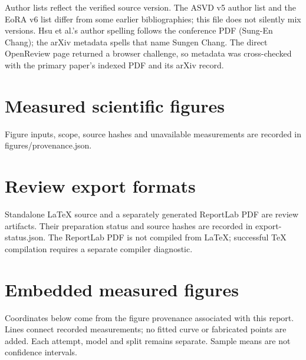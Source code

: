 \documentclass[10pt]{article}
\begin{document}
Author lists reflect the verified source version. The ASVD v5 author list and
the EoRA v6 list differ from some earlier bibliographies; this file does not
silently mix versions. Hsu et al.'s author spelling follows the conference PDF
(Sung-En Chang); the arXiv metadata spells that name Sungen Chang. The direct
OpenReview page returned a browser challenge, so metadata was cross-checked
with the primary paper's indexed PDF and its arXiv record.

\section{Measured scientific figures}








Figure inputs, scope, source hashes and unavailable measurements are recorded in figures/provenance.json.

\section{Review export formats}

Standalone LaTeX source and a separately generated ReportLab PDF are review artifacts. Their preparation status and source hashes are recorded in export-status.json. The ReportLab PDF is not compiled from LaTeX; successful TeX compilation requires a separate compiler diagnostic.
\section{Embedded measured figures}
Coordinates below come from the figure provenance associated with this report. Lines connect recorded measurements; no fitted curve or fabricated points are added. Each attempt, model and split remains separate. Sample means are not confidence intervals.
\end{document}
